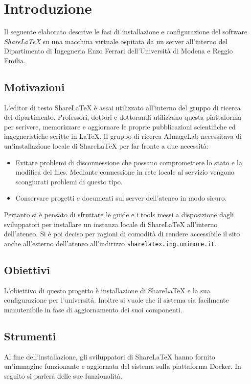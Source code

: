 \chapter{Introduzione}
\label{Introduzione}
\thispagestyle{empty}

Il seguente elaborato descrive le fasi di installazione e configurazione del software \emph{ShareLaTeX} su una macchina virtuale ospitata da un server all'interno del Dipartimento di Ingegneria Enzo Ferrari dell'Università di Modena e Reggio Emilia.

\section{Motivazioni}
L'editor di testo ShareLaTeX è assai utilizzato all'interno del gruppo di ricerca del dipartimento. Professori, dottori e dottorandi utilizzano questa piattaforma per scrivere, memorizzare e aggiornare le proprie pubblicazioni scientifiche ed ingegneristiche scritte in \LaTeX. Il gruppo di ricerca AImageLab necessitava di un'installazione locale di ShareLaTeX per far fronte a due necessità:
\begin{itemize}
    \item Evitare problemi di disconnessione che possano compromettere lo stato e la modifica dei files. Mediante connessione in rete locale al servizio vengono scongiurati problemi di questo tipo.
    \item Conservare progetti e documenti sul server dell'ateneo in modo sicuro.
\end{itemize}
Pertanto si è pensato di sfruttare le guide e i tools messi a disposizione dagli sviluppatori per installare un instanza locale di ShareLaTeX all'interno dell'ateneo. Si è poi deciso per ragioni di comodità di rendere accessibile il sito anche all'esterno dell'ateneo all'indirizzo \verb|sharelatex.ing.unimore.it|.

\section{Obiettivi}
L'obiettivo di questo progetto è installazione di ShareLaTeX e la sua configurazione per l'università. Inoltre si vuole che il sistema sia facilmente manutenibile in fase di aggiornamento dei suoi componenti.

\section{Strumenti}
Al fine dell'installazione, gli sviluppatori di ShareLaTeX hanno fornito un'immagine funzionante e aggiornata del sistema sulla piattaforma Docker. In seguito si parlerà delle sue funzionalità.

